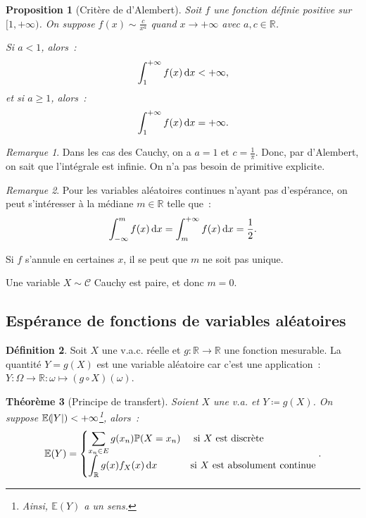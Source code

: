 \documentclass{article}
\newcommand{\E}{\mathbb E}
\renewcommand{\P}{\mathbb P}
\newcommand{\R}{\mathbb R}
\newtheorem{thm}{Théorème}[section]
\newtheorem{prp}[thm]{Proposition}
\theoremstyle{definition}
\newtheorem{déf}[thm]{Définition}
\theoremstyle{remark}
\newtheorem*{rmq}{Remarque}
\begin{document}
		\begin{prp}[Critère de d'Alembert] Soit $f$ une fonction définie positive sur $[1, +\infty)$. On suppose $f(x) \sim \frac c{x^a}$ quand $x \to +\infty$
		avec $a, c \in \R$.

		Si $a < 1$, alors~:
		\[\int_1^{+\infty}f(x)\dif x < +\infty,\]
		et si $a \geq 1$, alors~:
		\[\int_1^{+\infty}f(x)\dif x = +\infty.\]
		\end{prp}

		\begin{rmq} Dans les cas des Cauchy, on a $a=1$ et $c = \frac 1\pi$. Donc, par d'Alembert, on sait que l'intégrale est infinie. On n'a pas besoin de
		primitive explicite. \end{rmq}

		\begin{rmq} Pour les variables aléatoires continues n'ayant pas d'espérance, on peut s'intéresser à la médiane $m \in \R$ telle que~:
		\[\int_{-\infty}^mf(x)\dif x = \int_m^{+\infty}f(x)\dif x = \frac 12.\]

		Si $f$ s'annule en certaines $x$, il se peut que $m$ ne soit pas unique.

		Une variable $X \sim \mathcal C$ Cauchy est paire, et donc $m = 0$.
		\end{rmq}
	
	\subsection{Espérance de fonctions de variables aléatoires}
		\begin{déf} Soit $X$ une v.a.c. réelle et $g : \R \to \R$ une fonction mesurable. La quantité $Y = g(X)$ est une variable aléatoire car c'est une
		application~: $Y : \Omega \to \R : \omega \mapsto (g \circ X)(\omega)$. \end{déf}

		\begin{thm}[Principe de transfert] Soient $X$ une v.a. et $Y \coloneqq g(X)$. On suppose $\E(\abs Y) < +\infty$\footnote{Ainsi, $\E(Y)$ a un sens.},
		alors~:
		\begin{equation}
			\E(Y) =
				\begin{cases}
					\displaystyle \sum_{x_n \in E}g(x_n)\P(X = x_n) &\text{ si $X$ est discrète} \\
					\displaystyle \int_\R g(x)f_X(x)\dif x &\text{si $X$ est absolument continue}
				\end{cases}.
		\end{equation}
		\end{thm}
\end{document}
